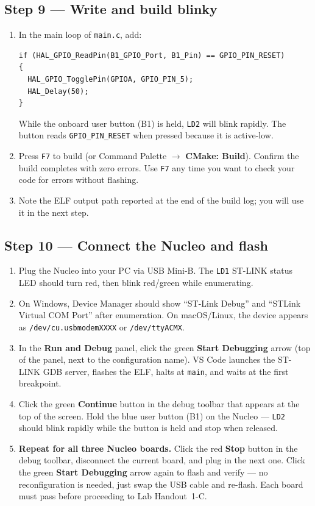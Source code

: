 \documentclass[11pt,letterpaper]{article}
\begin{document}
\newpage
\subsection{Step 9 --- Write and build blinky}
\begin{enumerate}[leftmargin=2em]
	\item In the main loop of \texttt{main.c}, add:
\begin{verbatim}
if (HAL_GPIO_ReadPin(B1_GPIO_Port, B1_Pin) == GPIO_PIN_RESET)
{
  HAL_GPIO_TogglePin(GPIOA, GPIO_PIN_5);
  HAL_Delay(50);
}
\end{verbatim}
	While the onboard user button (B1) is held, \texttt{LD2} will blink rapidly. The button reads \texttt{GPIO\_PIN\_RESET} when pressed because it is active-low.
	\item Press \texttt{F7} to build (or Command Palette $\to$ \textbf{CMake: Build}). Confirm the build completes with zero errors. Use \texttt{F7} any time you want to check your code for errors without flashing.
	\item Note the ELF output path reported at the end of the build log; you will use it in the next step.
\end{enumerate}

\newpage
\subsection{Step 10 --- Connect the Nucleo and flash}
\begin{enumerate}[leftmargin=2em]
	\item Plug the Nucleo into your PC via USB Mini-B. The \texttt{LD1} ST-LINK status \mbox{LED} should turn red, then blink red/green while enumerating.
	\item On Windows, Device Manager should show ``ST-Link Debug'' and ``STLink Virtual COM Port'' after enumeration. On macOS/Linux, the device appears as \texttt{/dev/cu.usbmodemXXXX} or \texttt{/dev/ttyACMX}.
	\item In the \textbf{Run and Debug} panel, click the green \textbf{Start Debugging} arrow (top of the panel, next to the configuration name). VS Code launches the ST-LINK GDB server, flashes the ELF, halts at \texttt{main}, and waits at the first breakpoint.
	\item Click the green \textbf{Continue} button in the debug toolbar that appears at the top of the screen. Hold the blue user button (B1) on the Nucleo --- \texttt{LD2} should blink rapidly while the button is held and stop when released.
	\item \textbf{Repeat for all three Nucleo boards.} Click the red \textbf{Stop} button in the debug toolbar, disconnect the current board, and plug in the next one. Click the green \textbf{Start Debugging} arrow again to flash and verify --- no reconfiguration is needed, just swap the USB cable and re-flash. Each board must pass before proceeding to Lab Handout~1-C.
\end{enumerate}
\end{document}
